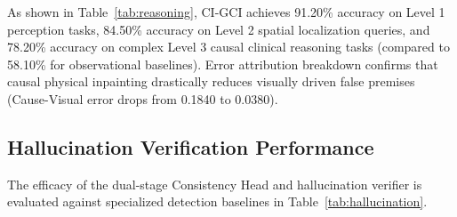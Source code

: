 \documentclass[journal,twoside,web]{ieeecolor}
\begin{document}
\begin{table}[t]
\caption{Kvasir-VQA-x1 Multi-Tiered Reasoning Breakdown}
\label{tab:reasoning}
\centering
\setlength{\tabcolsep}{3pt}
\end{table}

As shown in Table~\ref{tab:reasoning}, CI-GCI achieves 91.20\% accuracy on Level 1 perception tasks, 84.50\% accuracy on Level 2 spatial localization queries, and 78.20\% accuracy on complex Level 3 causal clinical reasoning tasks (compared to 58.10\% for observational baselines). Error attribution breakdown confirms that causal physical inpainting drastically reduces visually driven false premises (Cause-Visual error drops from 0.1840 to 0.0380).

\subsection{Hallucination Verification Performance}
The efficacy of the dual-stage Consistency Head and hallucination verifier is evaluated against specialized detection baselines in Table~\ref{tab:hallucination}.

\begin{table}[t]
\caption{Hallucination Detection Performance}
\label{tab:hallucination}
\centering
\setlength{\tabcolsep}{3pt}
\end{table}
\end{document}
